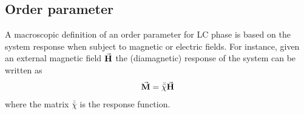 \documentclass[../main/main.tex]{subfiles}
\begin{document}
\begin{figure}[h!]
\begin{minipage}[c]{0.5\linewidth}
\end{minipage}
\begin{minipage}[]{0.5\linewidth}
\centering
{}
\end{minipage}
\caption{\label{fig:} }
\end{figure}

\subsection{Order parameter}
A macroscopic definition of an order parameter for LC phase is based on the system response when subject to magnetic or electric fields. For instance, given an external magnetic field \( \va{H} \) the (diamagnetic) response of the system can be written as
\begin{equation}
  \va{M} = \bar{\bar{\chi } } \va{H}
\end{equation}
where the matrix \(  \bar{\bar{\chi } } \) is the response function.
\end{document}
